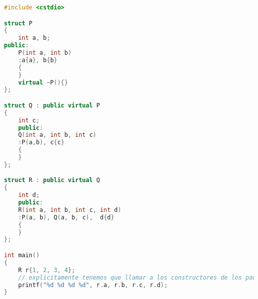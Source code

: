 \begin{lstlisting}[language=C++, caption={Problemas Herencia virtual 1}]
#include <cstdio>

struct P
{
    int a, b;
public:
    P(int a, int b)
    :a{a}, b{b}
    {
    }
    virtual ~P(){}
};

struct Q : public virtual P
{
    int c;
    public:
    Q(int a, int b, int c)
    :P(a,b), c{c}
    {
    }
};

struct R : public virtual Q
{
    int d;
    public:
    R(int a, int b, int c, int d)
    :P(a, b), Q(a, b, c),  d{d}
    {
    }
};

int main()
{
    R r{1, 2, 3, 4};
    // explicitamente tenemos que llamar a los constructores de los padres
    printf("%d %d %d %d", r.a, r.b, r.c, r.d);
}
\end{lstlisting}

